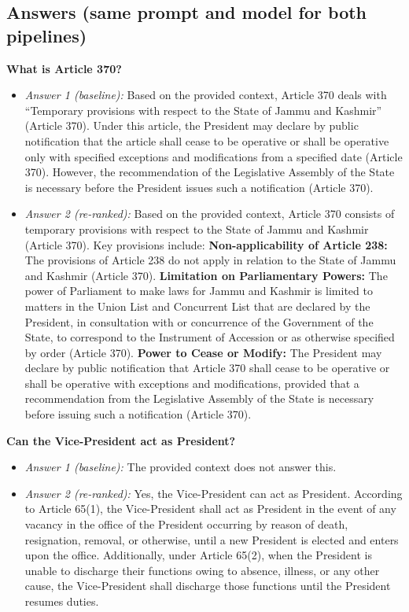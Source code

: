 \documentclass[10pt,a4paper]{article}
\begin{document}
\subsection*{Answers (same prompt and model for both pipelines)}
\textbf{What is Article 370?}
\begin{itemize}[nosep,leftmargin=1.2em]
\item \emph{Answer 1 (baseline):} Based on the provided context, Article 370 deals with ``Temporary provisions with respect to the State of Jammu and Kashmir'' (Article 370). Under this article, the President may declare by public notification that the article shall cease to be operative or shall be operative only with specified exceptions and modifications from a specified date (Article 370). However, the recommendation of the Legislative Assembly of the State is necessary before the President issues such a notification (Article 370).
\item \emph{Answer 2 (re-ranked):} Based on the provided context, Article 370 consists of temporary provisions with respect to the State of Jammu and Kashmir (Article 370). Key provisions include: \textbullet{} \textbf{Non-applicability of Article 238:} The provisions of Article 238 do not apply in relation to the State of Jammu and Kashmir (Article 370). \textbullet{} \textbf{Limitation on Parliamentary Powers:} The power of Parliament to make laws for Jammu and Kashmir is limited to matters in the Union List and Concurrent List that are declared by the President, in consultation with or concurrence of the Government of the State, to correspond to the Instrument of Accession or as otherwise specified by order (Article 370). \textbullet{} \textbf{Power to Cease or Modify:} The President may declare by public notification that Article 370 shall cease to be operative or shall be operative with exceptions and modifications, provided that a recommendation from the Legislative Assembly of the State is necessary before issuing such a notification (Article 370).
\end{itemize}
\textbf{Can the Vice-President act as President?}
\begin{itemize}[nosep,leftmargin=1.2em]
\item \emph{Answer 1 (baseline):} The provided context does not answer this.
\item \emph{Answer 2 (re-ranked):} Yes, the Vice-President can act as President. According to Article 65(1), the Vice-President shall act as President in the event of any vacancy in the office of the President occurring by reason of death, resignation, removal, or otherwise, until a new President is elected and enters upon the office. Additionally, under Article 65(2), when the President is unable to discharge their functions owing to absence, illness, or any other cause, the Vice-President shall discharge those functions until the President resumes duties.
\end{itemize}
\end{document}
